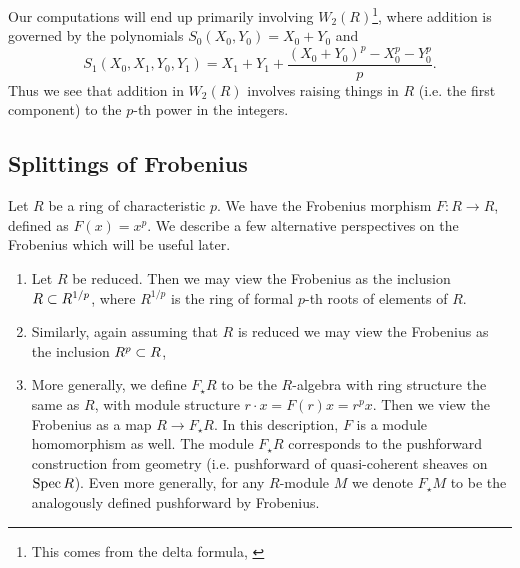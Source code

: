 \begin{rmk}
	\label{rmk:polyraise:w2}
    Our computations will end up primarily involving
    \(W_{2}(R)\)\footnote{
    This comes from the delta formula,
    \cite[Theorem~D]{kty-2022-fedder}},
    where addition is governed by the polynomials
	\(S_{0}(X_{0}, Y_{0}) = X_{0} + Y_{0}\)
	and
	\[
		S_{1}(X_{0}, X_{1}, Y_{0}, Y_{1})
		= X_{1} + Y_{1} + 
		\frac{(X_{0} + Y_{0})^{p} - X_{0}^{p} - Y_{0}^{p}}{p}
	.\] 
	Thus we see that addition in \(W_{2}(R)\) involves raising 
	things in \(R\) (i.e. the first component) to the \(p\)-th
	power in the integers.
\end{rmk}

\subsection{Splittings of Frobenius}

Let \(R\) be a ring of characteristic \(p\). 
We have the Frobenius morphism 
\(F \colon R \xrightarrow{} R\), 
defined as \(F(x) = x^p\).
We describe a few alternative perspectives on
the Frobenius which will be useful later.

\begin{rmk}
	\label{rmk:frob:perspectives}
    \hfill
    \begin{enumerate}[(1)]
    	\item Let \(R\) be reduced. 
    		Then we may view the Frobenius as the inclusion
    		\(R \subset R^{1 / p}\), where \(R^{1 / p}\) 
    		is the ring of formal \(p\)-th roots of elements
    		of \(R\).
    	\item Similarly, again assuming that \(R\) is reduced
    		we may view the Frobenius as the inclusion
    		\(R^{p} \subset R\), 
    	\item More generally, we define \(F_{\star}R\) to
			be the \(R\)-algebra with ring structure 
			the same as \(R\), with module structure
			\(r \cdot x = F(r)x = r^{p}x\).
			Then we view the Frobenius as a map
			\(R \xrightarrow{} F_{\star}R\).
			In this description, \(F\) is a module 
			homomorphism as well. 
			The module \(F_{\star}R\) corresponds to the
			pushforward construction from geometry
			(i.e. pushforward of quasi-coherent
			sheaves on \(\operatorname{Spec} R\)).
			Even more generally, for any \(R\)-module
			\(M\) we denote \(F_{\star}M\) to be
			the analogously defined pushforward by
			Frobenius.
    \end{enumerate}
\end{rmk}

